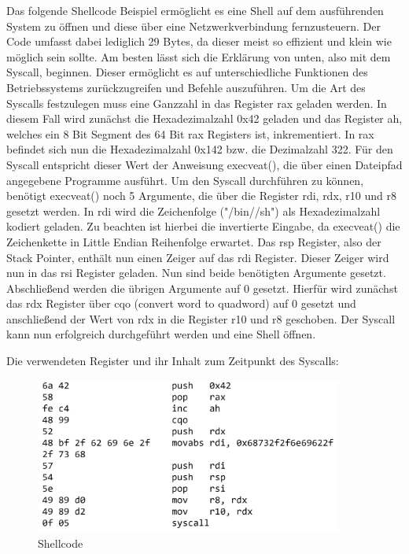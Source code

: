 Das folgende Shellcode Beispiel ermöglicht es eine Shell auf dem ausführenden System zu öffnen und diese über eine Netzwerkverbindung fernzusteuern. 
Der Code umfasst dabei lediglich 29 Bytes, da dieser meist so effizient und klein wie möglich sein sollte. 
Am besten lässt sich die Erklärung von unten, also mit dem Syscall, beginnen. 
Dieser ermöglicht es auf unterschiedliche Funktionen des Betriebssystems zurückzugreifen und Befehle auszuführen. 
Um die Art des Syscalls festzulegen muss eine Ganzzahl in das Register rax geladen werden. 
In diesem Fall wird zunächst die Hexadezimalzahl 0x42 geladen und das Register ah, welches ein 8 Bit Segment des 64 Bit rax Registers ist, inkrementiert. 
In rax befindet sich nun die Hexadezimalzahl 0x142 bzw. die Dezimalzahl 322. Für den Syscall entspricht dieser Wert der Anweisung execveat(), 
die über einen Dateipfad angegebene Programme ausführt. Um den Syscall durchführen zu können, benötigt execveat() noch 5 Argumente, 
die über die Register rdi, rdx, r10 und r8 gesetzt werden. In rdi wird die Zeichenfolge ("/bin//sh") als Hexadezimalzahl kodiert geladen. 
Zu beachten ist hierbei die invertierte Eingabe, da execveat() die Zeichenkette in Little Endian Reihenfolge erwartet. Das rsp Register, also der Stack Pointer, 
enthält nun einen Zeiger auf das rdi Register. Dieser Zeiger wird nun in das rsi Register geladen. Nun sind beide benötigten Argumente gesetzt. 
Abschließend werden die übrigen Argumente auf 0 gesetzt. Hierfür wird zunächst das rdx Register über cqo (convert word to quadword) auf 0 gesetzt und
anschließend der Wert von rdx in die Register r10 und r8 geschoben. Der Syscall kann nun erfolgreich durchgeführt werden und eine Shell öffnen. \cite{Syscalls} \cite{execman}

Die verwendeten Register und ihr Inhalt zum Zeitpunkt des Syscalls:

\begin{figure}[h]
    \centering
    \includegraphics[width=0.9\textwidth,height=0.75\textheight,keepaspectratio]{images/shellstorm.png}
    \caption{Shellcode}
\end{figure}
\cite{shellstorm}

